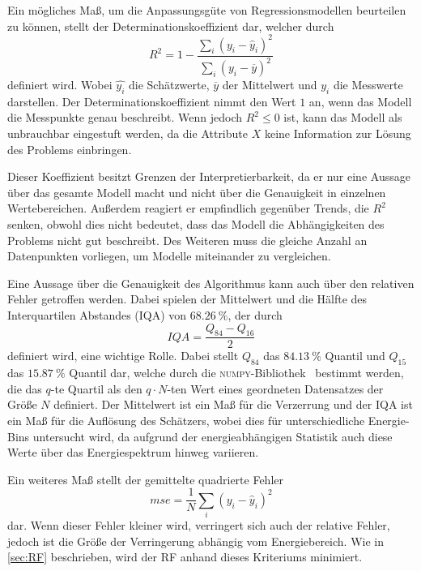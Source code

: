 Ein mögliches Maß, um die Anpassungsgüte von Regressionsmodellen beurteilen zu können, stellt der Determinationskoeffizient dar, welcher
durch
\begin{equation}
  R^2 = 1 - \frac{\sum_i (y_i-\hat{y}_i)^2}{\sum_i (y_i - \overline{y})^2}
\end{equation}
definiert wird. Wobei $\hat{y_i}$ die Schätzwerte, $\overline{y}$ der Mittelwert und $y_i$ die Messwerte darstellen.
Der Determinationskoeffizient nimmt den Wert $1$ an, wenn das Modell die Messpunkte genau beschreibt. Wenn jedoch
$R^2 \leq 0$ ist, kann das Modell als unbrauchbar eingestuft werden, da die Attribute $X$ keine Information zur
Lösung des Problems einbringen.

Dieser Koeffizient besitzt Grenzen der Interpretierbarkeit, da er nur eine Aussage über das gesamte Modell macht und
nicht über die Genauigkeit in einzelnen Wertebereichen.
Außerdem reagiert er empfindlich gegenüber Trends, die $R^2$ senken, obwohl dies nicht bedeutet, dass das Modell die Abhängigkeiten des Problems
nicht gut beschreibt.
Des Weiteren muss die gleiche Anzahl an Datenpunkten vorliegen, um Modelle
miteinander zu vergleichen.

Eine Aussage über die Genauigkeit des Algorithmus kann auch über den relativen Fehler getroffen werden. Dabei spielen der Mittelwert und die
Hälfte des Interquartilen Abstandes (IQA) von $\SI{68.26}{\percent}$, der durch
\begin{equation}
  IQA = \frac{Q_{84}-Q_{16}}{2}
\end{equation}
definiert wird, eine wichtige Rolle.
Dabei stellt $Q_{84}$ das $\SI{84.13}{\percent}$ Quantil und $Q_{15}$ das $\SI{15.87}{\percent}$ Quantil dar, welche durch die \textsc{numpy}-Bibliothek~\cite{scipy}
bestimmt werden, die das $q$-te Quartil als den $q \cdot N$-ten Wert eines geordneten Datensatzes der Größe $N$ definiert.
Der Mittelwert ist ein Maß für die Verzerrung und der IQA ist ein Maß für die Auflösung des Schätzers, wobei dies für unterschiedliche
Energie-Bins untersucht wird, da aufgrund der energieabhängigen Statistik auch diese Werte über das Energiespektrum hinweg variieren.

Ein weiteres Maß stellt der gemittelte quadrierte Fehler
\begin{equation}
  mse = \frac{1}{N} \sum_i (y_i-\hat{y}_i)^2
\end{equation}
dar.
Wenn dieser Fehler kleiner wird, verringert sich auch der relative Fehler, jedoch ist die Größe der Verringerung abhängig vom Energiebereich.
Wie in \autoref{sec:RF} beschrieben, wird der RF anhand dieses Kriteriums minimiert.

